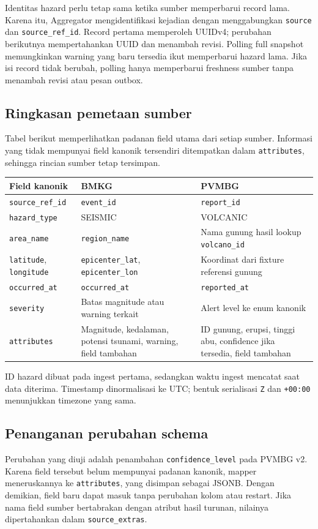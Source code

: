 Identitas hazard perlu tetap sama ketika sumber memperbarui record lama. Karena itu, Aggregator mengidentifikasi kejadian dengan menggabungkan \texttt{source} dan \texttt{source\_ref\_id}. Record pertama memperoleh UUIDv4; perubahan berikutnya mempertahankan UUID dan menambah revisi. Polling full snapshot memungkinkan warning yang baru tersedia ikut memperbarui hazard lama. Jika isi record tidak berubah, polling hanya memperbarui freshness sumber tanpa menambah revisi atau pesan outbox.

\subsection{Ringkasan pemetaan sumber}
Tabel berikut memperlihatkan padanan field utama dari setiap sumber. Informasi yang tidak mempunyai field kanonik tersendiri ditempatkan dalam \texttt{attributes}, sehingga rincian sumber tetap tersimpan.
\begin{center}\small
\begin{tabularx}{\textwidth}{>{\raggedright\arraybackslash}p{}YY}
\toprule
Field kanonik & BMKG & PVMBG \\
\midrule
\texttt{source\_ref\_id} & \texttt{event\_id} & \texttt{report\_id} \\
\texttt{hazard\_type} & SEISMIC & VOLCANIC \\
\texttt{area\_name} & \texttt{region\_name} & Nama gunung hasil lookup \texttt{volcano\_id} \\
\texttt{latitude}, \texttt{longitude} & \texttt{epicenter\_lat}, \texttt{epicenter\_lon} & Koordinat dari fixture referensi gunung \\
\texttt{occurred\_at} & \texttt{occurred\_at} & \texttt{reported\_at} \\
\texttt{severity} & Batas magnitude atau warning terkait & Alert level ke enum kanonik \\
\texttt{attributes} & Magnitude, kedalaman, potensi tsunami, warning, field tambahan & ID gunung, erupsi, tinggi abu, confidence jika tersedia, field tambahan \\
\bottomrule
\end{tabularx}
\end{center}
ID hazard dibuat pada ingest pertama, sedangkan waktu ingest mencatat saat data diterima. Timestamp dinormalisasi ke UTC; bentuk serialisasi \texttt{Z} dan \texttt{+00:00} menunjukkan timezone yang sama.

\subsection{Penanganan perubahan schema}
Perubahan yang diuji adalah penambahan \texttt{confidence\_level} pada PVMBG v2. Karena field tersebut belum mempunyai padanan kanonik, mapper meneruskannya ke \texttt{attributes}, yang disimpan sebagai JSONB. Dengan demikian, field baru dapat masuk tanpa perubahan kolom atau restart. Jika nama field sumber bertabrakan dengan atribut hasil turunan, nilainya dipertahankan dalam \texttt{source\_extras}.

